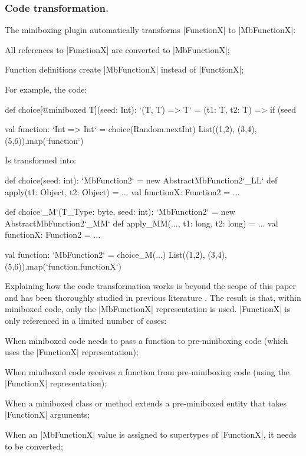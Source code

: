 \subsubsection{Code transformation.} The miniboxing plugin automatically transforms |FunctionX| to |MbFunctionX|:

\begin{compactitem}
  \item All references to |FunctionX| are converted to |MbFunctionX|;
  \item Function definitions create |MbFunctionX| instead of |FunctionX|;
\end{compactitem}

For example, the code:

\begin{lstlisting-nobreak}
 def choice[@miniboxed T](seed: Int): `(T, T) => T` =
   (t1: T, t2: T) => if (seed %

 val function: `Int => Int` = choice(Random.nextInt)
 List((1,2), (3,4), (5,6)).map(`function`)
\end{lstlisting-nobreak}

Is transformed into:

\begin{lstlisting-nobreak}
 def choice(seed: int): `MbFunction2` =
   new AbstractMbFunction2`_LL` {
     def apply(t1: Object, t2: Object) = ...
     val functionX: Function2 = ...
   }
\end{lstlisting-nobreak}

\begin{lstlisting-nobreak}
 def choice`_M`(T_Type: byte, seed: int): `MbFunction2` =
   new AbstractMbFunction2`_MM` {
     def apply_MM(..., t1: long, t2: long) = ...
     val functionX: Function2 = ...
   }

 val function: `MbFunction2` = choice_M(...)
 List((1,2), (3,4), (5,6)).map(`function.functionX`)
\end{lstlisting-nobreak}

Explaining how the code transformation works is beyond the scope of this paper and has been thoroughly studied in previous literature \cite{ldl,ildl-tech}. The result is that, within miniboxed code, only the |MbFunctionX| representation is used. |FunctionX| is only referenced in a limited number of cases:
\begin{compactitem}
  \item When miniboxed code needs to pass a function to pre-miniboxing code (which uses the |FunctionX| representation);
  \item When miniboxed code receives a function from pre-miniboxing code (using the |FunctionX| representation);
  \item When a miniboxed class or method extends a pre-miniboxed entity that takes |FunctionX| arguments;
  \item When an |MbFunctionX| value is assigned to supertypes of |FunctionX|, it needs to be converted;
\end{compactitem}

